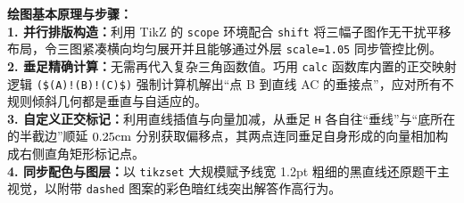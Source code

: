 \vspace{0.6cm}

{\small\color{blue!70!black}
\textbf{绘图基本原理与步骤：}\\
\textbf{1. 并行排版构造：}利用 TikZ 的 \texttt{scope} 环境配合 \texttt{shift} 将三幅子图作无干扰平移布局，令三图紧凑横向均匀展开并且能够通过外层 \texttt{scale=1.05} 同步管控比例。\\
\textbf{2. 垂足精确计算：}无需再代入复杂三角函数值。巧用 \texttt{calc} 函数库内置的正交映射逻辑 \texttt{(\$(A)!(B)!(C)\$)} 强制计算机解出“点 B 到直线 AC 的垂接点”，应对所有不规则倾斜几何都是垂直与自适应的。\\
\textbf{3. 自定义正交标记：}利用直线插值与向量加减，从垂足 \texttt{H} 各自往“垂线”与“底所在的半截边”顺延 $0.25\rm{cm}$ 分别获取偏移点，其两点连同垂足自身形成的向量相加构成右侧直角矩形标记点。\\
\textbf{4. 同步配色与图层：}以 \texttt{tikzset} 大规模赋予线宽 1.2pt 粗细的黑直线还原题干主视觉，以附带 \texttt{dashed} 图案的彩色暗红线突出解答作高行为。
}

